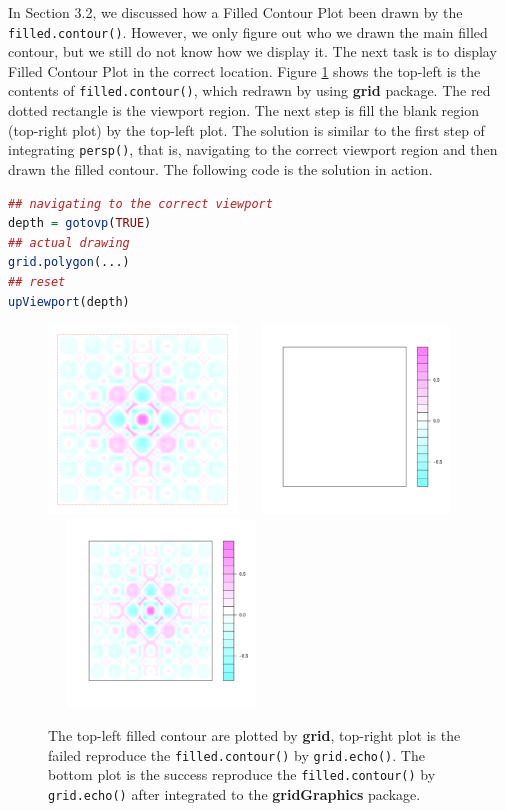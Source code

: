 \documentclass[11pt,twoside]{report}
\begin{document}
In Section 3.2, we discussed how a Filled Contour Plot been drawn by the \texttt{filled.contour()}. However, we only figure out who we drawn the main filled contour, but we still do not know how we display it. The next task is to display Filled Contour Plot in the correct location. Figure \ref{figure_4.6} shows the top-left is the contents of \texttt{filled.contour()}, which redrawn by using \textbf{grid} package. The red dotted rectangle is the viewport region. The next step is fill the blank region (top-right plot) by the top-left plot. The solution is similar to the first step of integrating \texttt{persp()}, that is, navigating to the correct viewport region and then drawn the filled contour. The following code is the solution in action.
\begin{lstlisting}[language = R]
## navigating to the correct viewport
depth = gotovp(TRUE)
## actual drawing
grid.polygon(...)
## reset
upViewport(depth)
\end{lstlisting}
\begin{figure}[h]
	\begin{center}
		\includegraphics[height = 5cm, width = 5cm]{figure/filledContour_origin_02.pdf}
		\includegraphics[height = 5cm, width = 6cm]{figure/filledContour_origin_03.pdf}
		\includegraphics[height = 5cm, width = 6cm]{figure/filledContour_origin_01.pdf}
		\caption{The top-left filled contour are plotted by \textbf{grid}, top-right plot is the failed reproduce the \texttt{filled.contour()} by \texttt{grid.echo()}. The bottom plot is the success reproduce the \texttt{filled.contour()} by \texttt{grid.echo()} after integrated to the \textbf{gridGraphics} package.}
		\label{figure_4.6}
	\end{center}
\end{figure}
\end{document}
